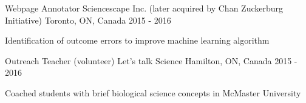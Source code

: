 


\begin{cventries}


\cventry
{Webpage Annotator} %
{Sciencescape Inc. (later acquired by Chan Zuckerburg Initiative)} %
{Toronto, ON, Canada} %
{2015 - 2016} %
{ %
\begin{cvitems}
\item {Identification of outcome errors to improve machine learning algorithm}
\end{cvitems}
}


\cventry
{Outreach Teacher (volunteer)} %
{Let's talk Science} %
{Hamilton, ON, Canada} %
{2015 - 2016} %
{ %
\begin{cvitems}
\item {Coached students with brief biological science concepts in McMaster University}
\end{cvitems}
}


\end{cventries}